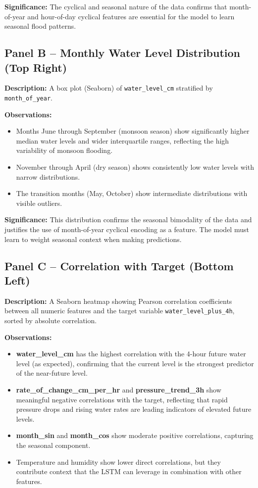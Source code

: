 \textbf{Significance:} The cyclical and seasonal nature of the data confirms that month-of-year and hour-of-day cyclical features are essential for the model to learn seasonal flood patterns.

\subsection{Panel B -- Monthly Water Level Distribution (Top Right)}

\textbf{Description:} A box plot (Seaborn) of \texttt{water\_\allowbreak{}level\_\allowbreak{}cm} stratified by \texttt{month\_\allowbreak{}of\_\allowbreak{}year}.

\textbf{Observations:}
\begin{itemize}[leftmargin=1.5em]
  \item Months June through September (monsoon season) show significantly higher median water levels and wider interquartile ranges, reflecting the high variability of monsoon flooding.
  \item November through April (dry season) shows consistently low water levels with narrow distributions.
  \item The transition months (May, October) show intermediate distributions with visible outliers.
\end{itemize}

\textbf{Significance:} This distribution confirms the seasonal bimodality of the data and justifies the use of month-of-year cyclical encoding as a feature. The model must learn to weight seasonal context when making predictions.

\subsection{Panel C -- Correlation with Target (Bottom Left)}

\textbf{Description:} A Seaborn heatmap showing Pearson correlation coefficients between all numeric features and the target variable \texttt{water\_\allowbreak{}level\_\allowbreak{}plus\_\allowbreak{}4h}, sorted by absolute correlation.

\textbf{Observations:}
\begin{itemize}[leftmargin=1.5em]
  \item \textbf{water\_level\_cm} has the highest correlation with the 4-hour future water level (as expected), confirming that the current level is the strongest predictor of the near-future level.
  \item \textbf{rate\_of\_change\_cm\_per\_hr} and \textbf{pressure\_trend\_3h} show meaningful negative correlations with the target, reflecting that rapid pressure drops and rising water rates are leading indicators of elevated future levels.
  \item \textbf{month\_sin} and \textbf{month\_cos} show moderate positive correlations, capturing the seasonal component.
  \item Temperature and humidity show lower direct correlations, but they contribute context that the LSTM can leverage in combination with other features.
\end{itemize}

